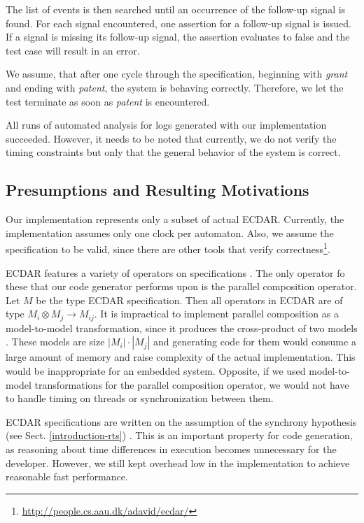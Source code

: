 The list of events is then searched until an occurrence of the follow-up signal
is found. For each signal encountered, one assertion for a follow-up signal is
issued. If a signal is missing its follow-up signal, the assertion evaluates to
false and the test case will result in an error.

We assume, that after one cycle through the specification, beginning with
\emph{grant} and ending with \emph{patent}, the system is behaving
correctly. Therefore, we let the test terminate as soon as \emph{patent} is
encountered.

All runs of automated analysis for logs generated with our implementation
succeeded. However, it needs to be noted that currently, we do not verify the
timing constraints but only that the general behavior of the system is correct.

\subsection{Presumptions and Resulting Motivations}
\label{implementation-presumptions}

Our implementation represents only a subset of actual ECDAR. Currently, the
implementation assumes only one clock per automaton. Also, we assume the
specification to be valid, since there are other tools that verify
correctness\footnote{\url{http://people.cs.aau.dk/adavid/ecdar/}}.

ECDAR features a variety of operators on specifications
\cite{david_compositional_2012}. The only operator fo these that our code
generator performs upon is the parallel composition operator. Let $M$ be the
type ECDAR specification. Then all operators in ECDAR are of type $M_{i}\otimes
M_{j}\rightarrow M_{ij}$. It is impractical to implement parallel composition as
a model-to-model transformation, since it produces the cross-product of two
models \cite{david_compositional_2012}. These models are size
$|M_{i}|\cdot|M_{j}|$ and generating code for them would consume a large amount
of memory and raise complexity of the actual implementation. This would be
inappropriate for an embedded system. Opposite, if we used model-to-model
transformations for the parallel composition operator, we would not have to
handle timing on threads or synchronization between them.

ECDAR specifications are written on the assumption of the synchrony hypothesis
(see Sect. \ref{introduction-rts}) \cite{david_compositional_2012}.  This is an
important property for code generation, as reasoning about time differences in
execution becomes unnecessary for the developer.  However, we still kept
overhead low in the implementation to achieve reasonable fast performance.
